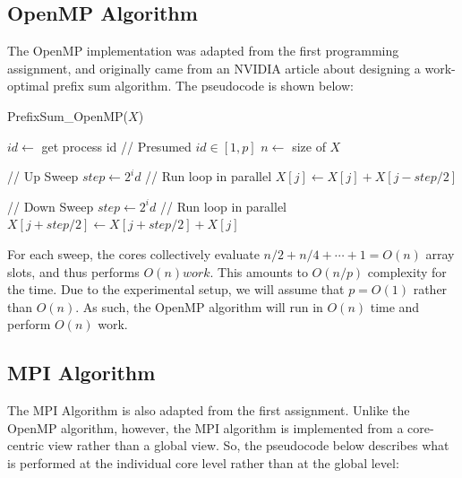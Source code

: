 \documentclass{article}
\begin{document}
\subsection*{OpenMP Algorithm}
The OpenMP implementation was adapted from the first programming assignment, and originally came from an NVIDIA article about designing a work-optimal prefix sum algorithm.  The pseudocode is shown below:
\begin{algorithm}[H]
\caption{PrefixSum\_OpenMP($X$)}
\begin{algorithmic}[1]
\STATE $id \gets $ get process id // Presumed $id \in [1,p]$
\STATE $n \gets $ size of $X$
\item[]
\STATE // Up Sweep
	\STATE $step \gets 2^id$
	\STATE // Run loop in parallel
		\STATE $X[j] \gets X[j] + X[j - step/2]$
	\ENDFOR
\ENDFOR
\item[]
\STATE // Down Sweep
	\STATE $step \gets 2^id$
	\STATE // Run loop in parallel
		\STATE $X[j + step/2] \gets X[j + step/2] + X[j]$
	\ENDFOR
\ENDFOR
\end{algorithmic}
\end{algorithm}

For each sweep, the cores collectively evaluate $n/2 + n/4 + \cdots + 1 = O(n)$ array slots, and thus performs $O(n) work$.  This amounts to $O(n/p)$ complexity for the time.  Due to the experimental setup, we will assume that $p = O(1)$ rather than $O(n)$.  As such, the OpenMP algorithm will run in $O(n)$ time and perform $O(n)$ work.


\subsection*{MPI Algorithm}
The MPI Algorithm is also adapted from the first assignment.  Unlike the OpenMP algorithm, however, the MPI algorithm is implemented from a core-centric view rather than a global view.  So, the pseudocode below describes what is performed at the individual core level rather than at the global level:
\end{document}
